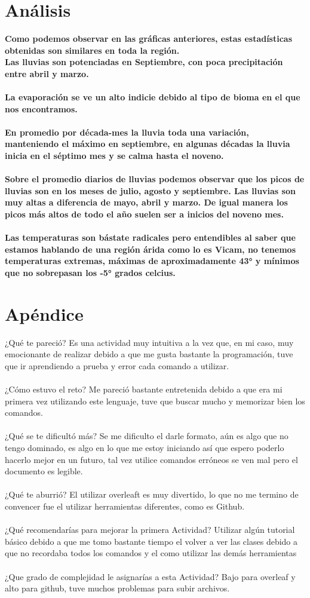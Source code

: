 \documentclass{article}
\begin{document}
\section{\LARGE Análisis}
\large\textbf{Como podemos observar en las gráficas anteriores, estas estadísticas obtenidas son similares en toda la región. 
\\Las lluvias son potenciadas en Septiembre, con poca precipitación entre abril y marzo.
\\
\\La evaporación se ve un alto indicie debido al tipo de bioma en el que nos encontramos.
\\
\\En promedio por década-mes la lluvia toda una variación, manteniendo el máximo en septiembre, en algunas décadas la lluvia inicia en el séptimo mes y se calma hasta el noveno.
\\
\\Sobre el promedio diarios de lluvias podemos observar que los picos de lluvias son en los meses de julio, agosto y septiembre. Las lluvias son muy altas a diferencia de mayo, abril y marzo. De igual manera los picos más altos de todo el año suelen ser a inicios del noveno mes.
\\
\\Las temperaturas son bástate radicales pero entendibles al saber que estamos hablando de una región árida como lo es Vicam, no tenemos temperaturas extremas, máximas de aproximadamente 43° y mínimos que no sobrepasan los -5° grados celcius.}

\section{\LARGE Apéndice}
¿Qué te pareció? Es una actividad muy intuitiva a la vez que, en mi caso, muy emocionante de realizar debido a que me gusta bastante la programación, tuve que ir aprendiendo a prueba y error cada comando a utilizar.
\\
\\
¿Cómo estuvo el reto? Me pareció bastante entretenida debido a que era mi primera vez utilizando este lenguaje, tuve que buscar mucho y memorizar bien los comandos.
\\
\\
¿Qué se te dificultó más? Se me dificulto el darle formato, aún es algo que no tengo dominado, es algo en lo que me estoy iniciando así que espero poderlo hacerlo mejor en un futuro, tal vez utilice comandos erróneos se ven mal pero el documento es legible.
\\
\\
¿Qué te aburrió? El utilizar overleaft es muy divertido, lo que no me termino de convencer fue el utilizar herramientas diferentes, como es Github.
\\
\\
¿Qué recomendarías para mejorar la primera Actividad? Utilizar algún tutorial básico debido a que me tomo bastante tiempo el volver a ver las clases debido a que no recordaba todos los comandos y el como utilizar las demás herramientas
\\
\\
¿Que grado de complejidad le asignarías a esta Actividad? Bajo para overleaf y alto para github, tuve muchos problemas para subir archivos.
\end{document}
